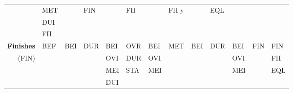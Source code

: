 \documentclass[11pt]{report}
\newenvironment{vvarmargin}[2]
{
  \begin{list}{}
  {
    \setlength{\topsep}{0pt}
    \setlength{\leftmargin}{0pt}
    \setlength{\rightmargin}{0pt}
    \setlength{\listparindent}{\parindent}
    \setlength{\itemindent}{\parindent}
    \setlength{\parsep}{0pt plus 1pt}
    \addtolength{\leftmargin}{#1}\addtolength{\rightmargin}{#2}
  }
  \item
}
{
  \end{list}
}
\begin{document}
\begin{table}[p]
\begin{vvarmargin}{-4cm}{-4cm}
\begin{center}
\begin{tabular}[t]{|r|l|l|l|l|l|l|l|l|l|l|l|l|}
                                        & MET                     &                         & FIN                     &                         & FII                     &                         & FII       y             &                         & EQL                     &                         &                         &                         \\
                                        & DUI                     &                         &                         &                         &                         &                         &                         &                         &                         &                         &                         &                         \\
                                        & FII                     &                         &                         &                         &                         &                         &                         &                         &                         &                         &                         &                         \\
                \hline
                \textbf{Finishes}       & BEF                     & BEI                     & DUR                     & BEI                     & OVR                     & BEI                     & MET                     & BEI                     & DUR                     & BEI                     & FIN                     & FIN                     \\
                (FIN)                   &                         &                         &                         & OVI                     & DUR                     & OVI                     &                         &                         &                         & OVI                     &                         & FII                     \\
                                        &                         &                         &                         & MEI                     & STA                     & MEI                     &                         &                         &                         & MEI                     &                         & EQL                     \\
                                        &                         &                         &                         & DUI                     &                         &                         &                         &                         &                         &                         &                         &                         \\

\end{tabular}
\end{center}
\end{vvarmargin}
\end{table}
\end{document}
